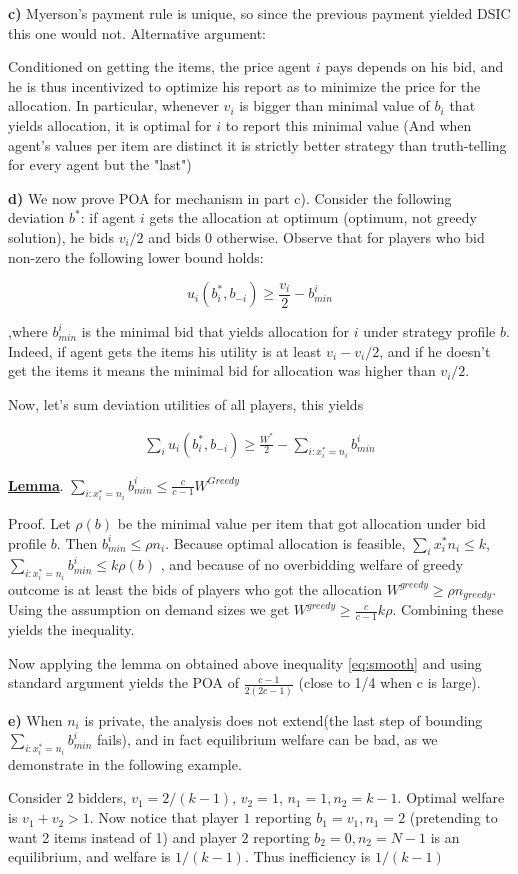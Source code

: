\textbf{c)} Myerson's payment rule is unique, so since the previous payment yielded DSIC this one would not. Alternative argument:

Conditioned on getting the items, the price agent $i$ pays depends on his bid, and he is thus incentivized to optimize his report as to minimize the price for the allocation. In particular, whenever $v_i$ is bigger than minimal value of $b_i$ that yields allocation, it is optimal for $i$ to report this minimal value (And when agent's values per item are distinct it is strictly better strategy than truth-telling for every agent but the "last")

\textbf{d)} We now prove POA for mechanism in part c). Consider the following deviation $b^*$: if agent $i$ gets the allocation at optimum (optimum, not greedy solution), he bids $v_i/2$ and bids 0 otherwise. Observe that for players who bid non-zero the following lower bound holds:

$$
u_i(b^*_i,b_{-i})\geq \frac{v_i}{2}-b^i_{min}
$$

,where $b^i_{min}$ is the minimal bid that yields allocation for $i$ under strategy profile $b$. Indeed, if agent gets the items his utility is at least $v_i-v_i/2$, and if he doesn't get the items it means the minimal bid for allocation was higher than $v_i/2$.

Now, let's sum deviation utilities of all players, this yields

\begin{align}
\label{eq:smooth}
\sum_i u_i(b_i^*,b_{-i})\geq \frac{W^*}{2}-\sum_{i: x^*_i=n_i} b^i_{min}
\end{align}

\textbf{\uline{Lemma}}. $\sum_{i: x^*_i=n_i} b^i_{min} \leq \frac{c}{c-1}W^{Greedy}$

Proof. Let $\rho(b)$ be the minimal value per item that got allocation under bid profile $b$. Then $b^i_{min}\leq \rho n_i$. Because optimal allocation is feasible, $\sum_i x^*_i n_i \leq k$, $\sum_{i: x^*_i=n_i} b^i_{min} \leq k\rho(b)$ , and because of no overbidding welfare of greedy outcome is at least the bids of players who got the allocation $W^{greedy} \geq \rho n_{greedy}$. Using the assumption on demand sizes we get $W^{greedy}\geq \frac{c}{c-1}k\rho$. Combining these yields the inequality.
\bigskip

Now applying the lemma on obtained above inequality \eqref{eq:smooth} and using standard argument yields the POA of $\frac{c-1}{2(2c-1)}$ (close to 1/4 when c is large).


\textbf{e)} When $n_i$ is private, the analysis does not extend(the last step of bounding  $\sum_{i: x^*_i=n_i} b^i_{min}$ fails), and in fact equilibrium welfare can be bad, as we demonstrate in the following example.

Consider 2 bidders, $v_1=2/(k-1)$, $v_2=1$, $n_1=1,n_2=k-1$. Optimal welfare is $v_1+v_2>1$. Now notice that player $1$ reporting $b_1=v_1,n_1=2$ (pretending to want 2 items instead of 1) and player $2$ reporting $b_2=0, n_2=N-1$ is an equilibrium, and welfare is $1/(k-1)$. Thus inefficiency is $1/(k-1)$